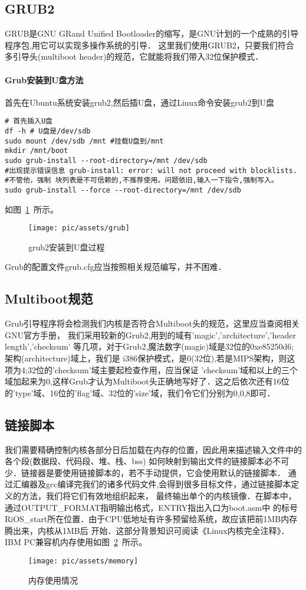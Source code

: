 \subsection{GRUB2}
GRUB是GNU GRand Unified Bootloader的缩写，是GNU计划的一个成熟的引导程序包,用它可以实现多操作系统的引导．
这里我们使用GRUB2，只要我们符合多引导头(multiboot header)的规范，它就能将我们带入32位保护模式．
\paragraph{Grub安装到U盘方法}
首先在Ubuntu系统安装grub2,然后插U盘，通过Linux命令安装grub2到U盘
\begin{verbatim}
# 首先插入U盘
df -h # U盘是/dev/sdb
sudo mount /dev/sdb /mnt #挂载U盘到/mnt
mkdir /mnt/boot 
sudo grub-install --root-directory=/mnt /dev/sdb
#出现提示错误信息 grub-install: error: will not proceed with blocklists.
#不管他，强制 块列表是不可信赖的,不推荐使用。问题依旧,输入一下指令,强制写入。
sudo grub-install --force --root-directory=/mnt /dev/sdb
\end{verbatim}
如图~\ref{grub}~所示。

\begin{figure}[!htbp]
	\centering	\texttt{[image: pic/assets/grub]}
    \caption{grub2安装到U盘过程}	\label{grub}	\end{figure}
Grub的配置文件grub.cfg应当按照相关规范编写，并不困难．
\subsection{Multiboot规范}
Grub引导程序将会检测我们内核是否符合Multiboot头的规范，这里应当查阅相关GNU官方手册，
我们采用较新的Grub2,用到的域有'magic','architecture','header length','checksum'
等几项，对于Grub2,魔法数字(magic)域是32位的0xe85250d6;架构(architecture)域上，我们是
i386保护模式，是0(32位),若是MIPS架构，则这项为4;32位的'checksum'域主要起检查作用，应当保证
'checksum'域和以上的三个域加起来为0,这样Grub才认为Multiboot头正确地写好了．这之后依次还有16位
的'type'域、16位的'flag'域、32位的'size'域，我们令它们分别为0,0,8即可．

\subsection{链接脚本}
我们需要精确控制内核各部分日后加载在内存的位置，因此用来描述输入文件中的各个段(数据段、代码段、堆、栈、bss)
如何映射到输出文件的链接脚本必不可少．链接器是要使用链接脚本的，若不手动提供，它会使用默认的链接脚本．
通过汇编器及gcc编译完我们的诸多代码文件,会得到很多目标文件，通过链接脚本定义的方法，我们将它们有效地组织起来，
最终输出单个的内核镜像．在脚本中，通过OUTPUT\_FORMAT指明输出格式，ENTRY指出入口为boot.asm中
的标号RiOS\_start所在位置．由于CPU低地址有许多预留给系统，故应该把前1MB内存腾出来，内核从1MB后
开始．这部分背景知识可阅读《Linux内核完全注释》．
IBM PC兼容机内存使用如图~\ref{memory}~所示。
\begin{figure}[!htbp]
	\centering	\texttt{[image: pic/assets/memory]}
    \caption{内存使用情况}	\label{memory}	\end{figure}

